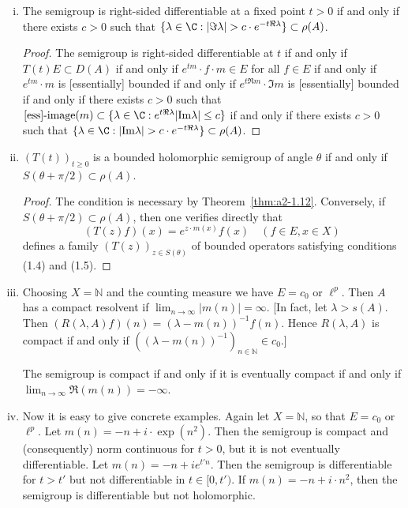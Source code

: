 \begin{example}
\begin{enumerate}[(i), wide]
\item \label{ex:a2-1.28-2}
The semigroup is right-sided differentiable at a fixed point
$t > 0$ 
if and only if there exists $c > 0$ such that 
$\{\lambda \in \C : |\Im \lambda| > c \cdot e^{-t\Re\lambda}\} \subset \rho(A)$.

\begin{proof}
The semigroup is right-sided differentiable at $t$ 
if and only if $T(t)E \subset D(A)$ 
if and only if $e^{tm} \cdot f \cdot m \in E$ for all $f \in E$ 
if and only if $e^{tm} \cdot m$ is [essentially] bounded 
if and only if $e^{t\Re m} \cdot \Im m$ is [essentially] bounded 
if and only if there exists $c > 0$ such that 
$[\text{ess}]\text{-}\text{image}(m) \subset 
\{\lambda \in \C : e^{t\Re\lambda}|\text{Im}\lambda| \leq c\}$ 
if and only if there exists $c > 0$ such that 
$\{\lambda \in \C : |\text{Im}\lambda| > c \cdot e^{-t\Re\lambda}\} \subset \rho(A)$.
\end{proof}

\item \label{ex:a2-1.28-3}
$(T(t))_{t \geq 0}$ is a bounded holomorphic semigroup of angle $\theta$ if and only if 
$S(\theta + \pi/2) \subset \rho(A)$.

\begin{proof}
The condition is necessary by Theorem~\ref{thm:a2-1.12}.
Conversely, if $S(\theta + \pi/2) \subset \rho(A)$, 
then one verifies directly that 
\[
(T(z)f)(x) = e^{z \cdot m(x)}f(x) \quad (f \in E, x \in X) 
\]
defines a family $(T(z))_{z \in S(\theta)}$ of bounded operators satisfying conditions (1.4) and (1.5).
\end{proof}

\item \label{ex:a2-1.28-4}
Choosing $X = \mathbb{N}$ and the counting measure we have $E = c_{0}$ or $\ell^{p}$.
Then $A$ has a compact resolvent if 
$\lim_{n \to \infty} |m(n)| = \infty$.
[In fact, let $\lambda > s(A)$.
Then $(R(\lambda,A)f)(n) = (\lambda-m(n))^{-1}f(n)$.
Hence $R(\lambda,A)$ is compact if and only if $((\lambda-m(n))^{-1})_{n \in \mathbb{N}} \in c_{0}$.]

The semigroup is compact if and only if it is eventually compact if and only if $\lim_{n \to \infty} \Re(m(n)) = -\infty$.

\item \label{ex:a2-1.28-5}
Now it is easy to give concrete examples.
Again let $X = \mathbb{N}$, so that $E = c_{0}$ or $\ell^{p}$.
Let $m(n) = -n + i \cdot \exp(n^2)$.
Then the semigroup is compact and (consequently) norm continuous for $t > 0$, but it is not eventually differentiable.
Let $m(n) = -n + ie^{t'n}$.
Then the semigroup is differentiable for $t > t'$ but not differentiable in $t \in [0,t')$.
If $m(n) = -n + i \cdot n^2$, then the semigroup is differentiable but not holomorphic.
\end{enumerate}
\end{example}	


